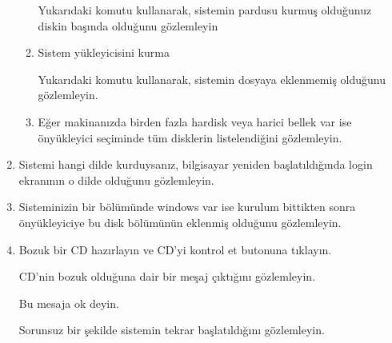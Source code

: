\documentclass[a4paper,10pt]{article}
\begin{document}
\begin{enumerate}
\begin{enumerate}
	Yukarıdaki komutu kullanarak, sistemin pardusu kurmuş olduğunuz diskin başında olduğunu gözlemleyin
    \item Sistem yükleyicisini kurma

	Yukarıdaki komutu kullanarak, sistemin dosyaya eklenmemiş olduğunu gözlemleyin.

    \item Eğer makinanızda birden fazla hardisk veya harici bellek var ise önyükleyici seçiminde tüm disklerin listelendiğini gözlemleyin.
      \end{enumerate}

\item Sistemi hangi dilde kurduysanız, bilgisayar yeniden başlatıldığında login ekranının o dilde olduğunu gözlemleyin.

 \item Sisteminizin bir bölümünde windows var ise kurulum bittikten sonra önyükleyiciye bu disk bölümünün eklenmiş olduğunu gözlemleyin.
\item Bozuk bir CD hazırlayın ve CD'yi kontrol et butonuna tıklayın.

CD'nin bozuk olduğuna dair bir meşaj çıktığını gözlemleyin.

Bu mesaja ok deyin.

Sorunsuz bir şekilde sistemin tekrar başlatıldığını gözlemleyin.

\end{enumerate}
\end{document}
